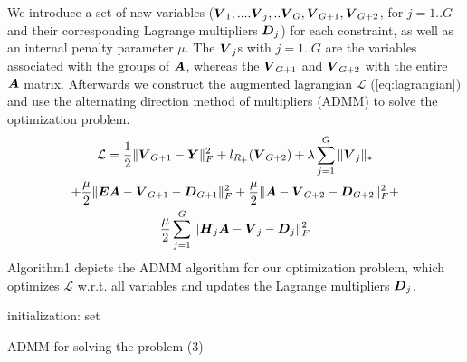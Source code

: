\documentclass{article}
\begin{document}
We introduce a set of new variables ($\mbox{\boldmath$V$}_1, .... \mbox{\boldmath$V$}_{j},..\mbox{\boldmath$V$}_{G},\\ \mbox{\boldmath$V$}_{G+1},\mbox{\boldmath$V$}_{G+2}$, for $j = 1..G$ and their corresponding Lagrange multipliers $\mbox{\boldmath$D$}_j$) for each constraint, as well as an internal penalty parameter $\mu$. %
The $\mbox{\boldmath$V$}_j$s with  $j = 1..G$ are the variables associated with the groups of $\mbox{\boldmath$A$}$, whereas the $\mbox{\boldmath$V$}_{G+1}$ and $\mbox{\boldmath$V$}_{G+2}$ with the entire $\mbox{\boldmath$A$}$ matrix.
Afterwards we construct the augmented lagrangian $\mathcal{L}$ (\ref{eq:lagrangian}) and use the alternating direction method of multipliers (ADMM)\cite{admm} to solve the optimization problem. 
\begin{gather} \label{eq:lagrangian}
\mathcal{L} = \frac{1}{2}\| \mbox{\boldmath$V$}_{G+1} - \mbox{\boldmath$Y$} \|_F^2 + l_{R_+}{(\mbox{\boldmath$V$}_{G+2})} + \lambda \sum_{j=1}^G{\| \mbox{\boldmath$V$}_j\|_*} \\ \nonumber
+ \frac{\mu}{2}\| \mbox{\boldmath$E$}\mbox{\boldmath$A$} - \mbox{\boldmath$V$}_{G+1} - \mbox{\boldmath$D$}_{G+1}\|_F^2 + \frac{\mu}{2}\| \mbox{\boldmath$A$} - \mbox{\boldmath$V$}_{G+2} - \mbox{\boldmath$D$}_{G+2}\|_F^2 +         \\ \nonumber
\frac{\mu}{2}\sum_{j=1}^G{\|\mbox{\boldmath$H$}_j\mbox{\boldmath$A$}  - \mbox{\boldmath$V$}_j - \mbox{\boldmath$D$}_j\|_F^2} 
\end{gather}
Algorithm1 depicts the ADMM algorithm for our optimization problem, which optimizes $\mathcal{L}$ w.r.t. all variables and updates the Lagrange multipliers  $\mbox{\boldmath$D$}_j$.
\begin{algorithm}[h!]
\SetAlgoLined
\KwResult{$\hat{\bA}$}
 initialization: set     \;
 \caption{ADMM for solving the problem (3)}
\end{algorithm}
\end{document}
